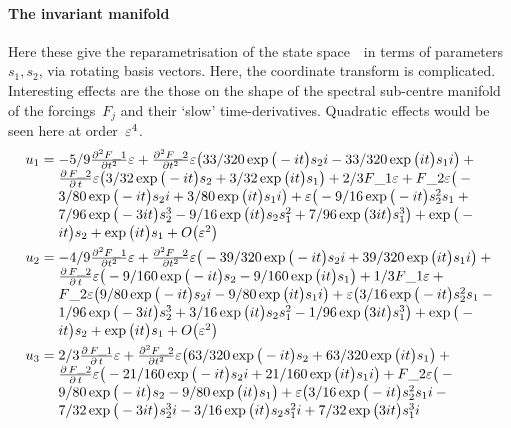 \paragraph{The invariant manifold} 
Here these give the reparametrisation of the state
space~\uv\ in terms of parameters~\(s_1,s_2\), via rotating
basis vectors. Here, the coordinate transform is
complicated.   Interesting effects are the those on the
shape of the spectral sub-centre manifold of the
forcings~\(F_j\) and their `slow' time-derivatives.
Quadratic effects would be seen here at order~\(\varepsilon^4\).
\begin{align*}&
u_{1}=\ParMath{
-5/9 \frac{\partial ^{2}F\_1}{\partial t^{2}} \eps{}+\frac{
\partial ^{2}F\_2}{\partial t^{2}} \eps{} \big(33/320 \exp \big(-i t
\big) s_{2} i-33/320 \exp \big(i t\big) s_{1} i\big)+\frac{\partial \,
F\_2}{\partial \,t} \eps{} \big(3/32 \exp \big(-i t\big) s_{2}+3/32 
\exp \big(i t\big) s_{1}\big)+2/3 F\_1 \eps{}+F\_2 \eps{} \big(-3/80
 \exp \big(-i t\big) s_{2} i+3/80 \exp \big(i t\big) s_{1} i\big)+\eps{
} \big(-9/16 \exp \big(-i t\big) s_{2}^{2} s_{1}+7/96 \exp \big(-3 i t
\big) s_{2}^{3}-9/16 \exp \big(i t\big) s_{2} s_{1}^{2}+7/96 \exp \big(3
 i t\big) s_{1}^{3}\big)+\exp \big(-i t\big) s_{2}+\exp \big(i t\big) s_
{1}+O\big(\varepsilon ^{2}\big)
}\\&
u_{2}=\ParMath{
-4/9 \frac{\partial ^{2}F\_1}{\partial t^{2}} \eps{}+\frac{
\partial ^{2}F\_2}{\partial t^{2}} \eps{} \big(-39/320 \exp \big(-i t
\big) s_{2} i+39/320 \exp \big(i t\big) s_{1} i\big)+\frac{\partial \,
F\_2}{\partial \,t} \eps{} \big(-9/160 \exp \big(-i t\big) s_{2}-9/160
 \exp \big(i t\big) s_{1}\big)+1/3 F\_1 \eps{}+F\_2 \eps{} \big(9/80
 \exp \big(-i t\big) s_{2} i-9/80 \exp \big(i t\big) s_{1} i\big)+\eps{}
  \big(3/16 \exp \big(-i t\big) s_{2}^{2} s_{1}-1/96 \exp \big(-3 i t
\big) s_{2}^{3}+3/16 \exp \big(i t\big) s_{2} s_{1}^{2}-1/96 \exp \big(3
 i t\big) s_{1}^{3}\big)+\exp \big(-i t\big) s_{2}+\exp \big(i t\big) s_
{1}+O\big(\varepsilon ^{2}\big)
}\\&
u_{3}=\ParMath{
2/3 \frac{\partial \,F\_1}{\partial \,t} \eps{}+\frac{\partial 
^{2}F\_2}{\partial t^{2}} \eps{} \big(63/320 \exp \big(-i t\big) s_{2}
+63/320 \exp \big(i t\big) s_{1}\big)+\frac{\partial \,F\_2}{\partial \,
t} \eps{} \big(-21/160 \exp \big(-i t\big) s_{2} i+21/160 \exp \big(i 
t\big) s_{1} i\big)+F\_2 \eps{} \big(-9/80 \exp \big(-i t\big) s_{2}-9
/80 \exp \big(i t\big) s_{1}\big)+\eps{} \big(3/16 \exp \big(-i t\big)
 s_{2}^{2} s_{1} i-7/32 \exp \big(-3 i t\big) s_{2}^{3} i-3/16 \exp 
\big(i t\big) s_{2} s_{1}^{2} i+7/32 \exp \big(3 i t\big) s_{1}^{3} i
}
\end{align*}
